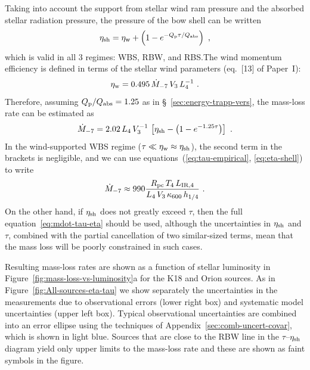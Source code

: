 Taking into account the support from stellar wind ram pressure and the
absorbed stellar radiation pressure, the pressure of the bow shell can
be written
\begin{equation}
  \label{eq:eta-shell-components}
  \eta_{\text{sh}} = \eta_{\text{w}} +  \left(  1 - e^{-Q_{\text{p}} \tau / Q_{\text{abs}}}\right) \ ,
\end{equation}
which is valid in all 3 regimes: WBS, RBW, and RBS.\@ The wind
momentum efficiency is defined in terms of the stellar wind parameters
(eq.~[13] of Paper~I):
\begin{equation}
  \label{eq:wind-eta-typical}
  \eta_{\text{w}} = \num{0.495} \,\dot{M}_{-7} \,V_3  \,L_4^{-1} \ .
\end{equation}
Therefore, assuming \(Q_{\text{p}}/Q_{\text{abs}} = 1.25\) as in
\S~\ref{sec:energy-trapp-vers}, the mass-loss rate can be estimated as
\begin{equation}
  \label{eq:mdot-tau-eta}
  \dot{M}_{-7} = 2.02 \, L_4 \, V_3^{-1} \,
  \left[ \eta\shell - \left(  1 - e^{-1.25 \tau} \right) \right]  \ .
\end{equation}
In the wind-supported WBS regime
(\(\tau \ll \eta_{\text{w}} \approx \eta_{\text{sh}}\)), the second term in the brackets is
negligible, and we can use equations~(\ref{eq:tau-empirical},
\ref{eq:eta-shell}) to write
\begin{equation}
  \label{eq:mdot-eta-wbs}
  \dot{M}_{-7} \approx 990 \frac{R_{\text{pc}} \, T_4 \, L_{\text{IR},4}}
  {L_4 \, V_3 \, \kappa_{600} \, h_{1/4}} \ .
\end{equation}
On the other hand, if \(\eta_{\text{sh}}\) does not greatly exceed \(\tau\), then
the full equation~\eqref{eq:mdot-tau-eta} should be used, although the
uncertainties in \(\eta_{\text{sh}}\) and \(\tau\), combined with the partial
cancellation of two similar-sized terms, mean that the mass loss will
be poorly constrained in such cases.

Resulting mass-loss rates are shown as a function of stellar
luminosity in Figure~\ref{fig:mass-loss-vs-luminosity}a for the K18
and Orion sources.  As in Figure~\ref{fig:All-sources-eta-tau} we show
separately the uncertainties in the measurements due to observational
errors (lower right box) and systematic model uncertainties (upper
left box).  Typical observational uncertainties are combined into an
error ellipse using the techniques of
Appendix~\ref{sec:comb-uncert-covar}, which is shown in light blue.
Sources that are close to the RBW line in the \(\tau\)--\(\eta_{\text{sh}}\)
diagram yield only upper limits to the mass-loss rate and these are
shown as faint symbols in the figure.

